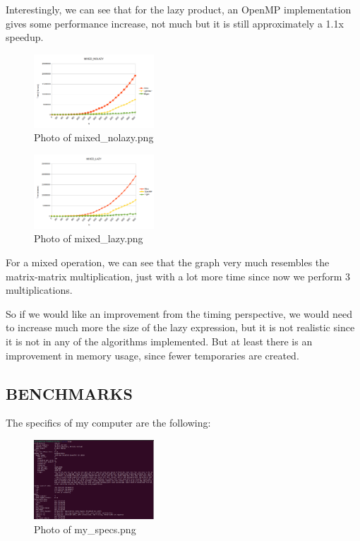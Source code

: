 \documentclass{article}
\begin{document}
Interestingly, we can see that for the lazy product, an OpenMP implementation gives some performance increase, not much but it is still approximately a 1.1x speedup.

\begin{figure}[htbp]
    \centering
    \includegraphics[width=0.4\textwidth]{mixed_nolazy.png}
    \caption{Photo of mixed\_nolazy.png}
\end{figure}

\begin{figure}[htbp]
    \centering
    \includegraphics[width=0.4\textwidth]{mixed_lazy.png}
    \caption{Photo of mixed\_lazy.png}
\end{figure}

For a mixed operation, we can see that the graph very much resembles the matrix-matrix multiplication, just with a lot more time since now we perform 3 multiplications.

So if we would like an improvement from the timing perspective, we would need to increase much more the size of the lazy expression, but it is not realistic since it is not in any of the algorithms implemented. But at least there is an improvement in memory usage, since fewer temporaries are created.

\subsection{BENCHMARKS}

The specifics of my computer are the following:

\begin{figure}[htbp]
    \centering
    \includegraphics[width=0.4\textwidth]{my_specs.png}
    \caption{Photo of my\_specs.png}
\end{figure}
\end{document}
